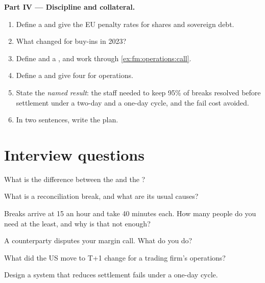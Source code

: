 \begin{problem}
\medskip\noindent\textbf{Part IV --- Discipline and collateral.}
\begin{enumerate}[resume]
\item Define a  and give the EU penalty rates for shares and sovereign debt.
\item What changed for buy-ins in 2023?
\item Define  and a , and work through \cref{ex:fm:operations:call}.
\item Define a  and give four for operations.
\item State the \emph{named result}: the staff needed to keep 95\% of breaks resolved before settlement under a two-day and a one-day cycle, and
the fail cost avoided.
\item In two sentences, write the plan.
\end{enumerate}
\end{problem}

\section{Interview questions}

\begin{interviewq}\label{iq:fm:operations:1}
What is the difference between the  and the ?
\end{interviewq}

\begin{interviewq}\label{iq:fm:operations:2}
What is a reconciliation break, and what are its usual causes?
\end{interviewq}

\begin{interviewq}\label{iq:fm:operations:3}
Breaks arrive at 15 an hour and take 40 minutes each. How many people do you need at the least, and why is that not enough?
\end{interviewq}

\begin{interviewq}\label{iq:fm:operations:4}
A counterparty disputes your margin call. What do you do?
\end{interviewq}

\begin{interviewq}\label{iq:fm:operations:5}
What did the US move to T+1 change for a trading firm's operations?
\end{interviewq}

\begin{interviewq}\label{iq:fm:operations:6}
Design a system that reduces settlement fails under a one-day cycle.
\end{interviewq}
